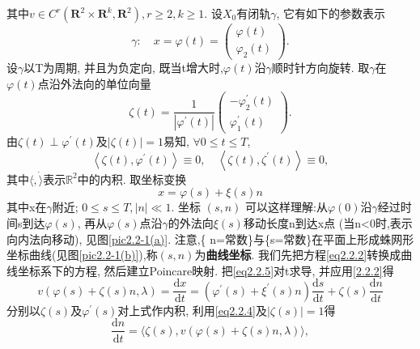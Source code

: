 其中\(
v \in C^{r}\left(\mathbf{R}^{2} \times \mathbf{R}^{k}, \mathbf{R}^{2}\right), r \geqslant 2, k \geqslant 1.
\)
设\(X_{0}\)有闭轨\(\gamma\),
它有如下的参数表示
\begin{equation*}
\gamma: \quad x=\varphi(t)=\left( \begin{array}{l}{\varphi(t)} \\ {\varphi_{2}(t)}\end{array}\right).
\end{equation*}
设\(\gamma\)以T为周期,
并且为负定向,
既当t增大时,\(\varphi(t)\)沿\(\gamma\)顺时针方向旋转.
取\(\gamma\)在\(\varphi(t)\)点沿外法向的单位向量
\begin{equation}
  \label{eq2.2.3}
\zeta(t)=\frac{1}{\left|\varphi^{\prime}(t)\right|} \left( \begin{array}{c}{-\varphi_{2}^{\prime}(t)} \\ {\varphi_{1}^{\prime}(t)}\end{array}\right).
\end{equation}
由\(\zeta(t) \perp \varphi^{\prime}(t) \text{及}|\zeta(t)|=1\)易知,
\(\forall 0 \leqslant t \leqslant T\),
\begin{equation}
  \label{2.2.4}
\left\langle\zeta(t), \varphi^{\prime}(t)\right\rangle \equiv 0, \quad\left\langle\zeta(t), \zeta^{\prime}(t)\right\rangle \equiv 0,
\end{equation}
其中\(\langle \dot ,\dot \rangle\)表示\(\mathbb{R}^{2}\)中的内积.
取坐标变换
\begin{equation}
  \label{eq2.2.5}
  x=\varphi(s)+\xi(s) n
\end{equation}
其中x在\(\gamma\)附近;
\(0 \leqslant s \leqslant T,|n| \ll 1 \).
坐标
\(
(s,n)
\)
可以这样理解:从\(\varphi(0)\)沿\(\gamma\)经过时间s到达\(\varphi(s)\),
再从\(\varphi(s)\)点沿\(\gamma\)的外法向\(\xi(s)\)移动长度n到达x点
(当n<0时,表示向内法向移动),
见图\ref{pic2.2-1(a)}.
注意,\{ n=常数\}与\{s=常数\}在平面上形成蛛网形坐标曲线(见图\ref{pic2.2-1(b)}),称\((s,n)\)为\textbf{曲线坐标}.
我们先把方程\eqref{eq2.2.2}转换成曲线坐标系下的方程,
然后建立Poincare映射.
把\eqref{eq2.2.5}对t求导,
并应用\eqref{2.2.2}得
\begin{equation}
  \label{eq2.2.6}
  v(\varphi(s)+\zeta(s) n, \lambda)=\frac{\mathrm{d} x}{\mathrm{d} t}=\left(\varphi^{\prime}(s)+\xi^{\prime}(s) n\right) \frac{\mathrm{d} s}{\mathrm{d} t}+\zeta(s) \frac{\mathrm{d} n}{\mathrm{d} t}
\end{equation}
分别以\(\zeta(s) \text{及} \varphi^{\prime}(s)\)对上式作内积,
利用\ref{eq2.2.4}及\(|\zeta(s)|=1\)得
\begin{equation*}
\frac{\mathrm{d} n}{\mathrm{d} t}=\langle\zeta(s), v(\varphi(s)+\zeta(s) n, \lambda)\rangle,
\end{equation*}
